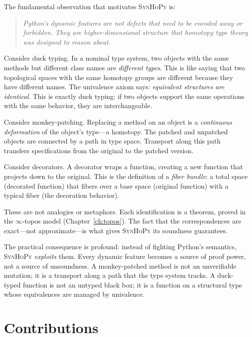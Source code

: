 \documentclass[11pt,a4paper]{report}
\theoremstyle{definition}
\theoremstyle{plain}
\newcommand{\synhopy}{\textsc{SynHoPy}}
\begin{document}
The fundamental observation that motivates \synhopy{} is:

\begin{quote}
\itshape
Python's dynamic features are not defects that need to be encoded away
or forbidden.  They are \emph{higher-dimensional structure} that homotopy
type theory was \emph{designed} to reason about.
\end{quote}

Consider duck typing.  In a nominal type system, two objects with the same
methods but different class names are \emph{different types}.  This is like
saying that two topological spaces with the same homotopy groups are
different because they have different names.  The univalence axiom says:
\emph{equivalent structures are identical}.  This is exactly duck typing:
if two objects support the same operations with the same behavior, they are
interchangeable.

Consider monkey-patching.  Replacing a method on an object is a
\emph{continuous deformation} of the object's type---a homotopy.  The
patched and unpatched objects are connected by a path in type space.
Transport along this path transfers specifications from the original to
the patched version.

Consider decorators.  A decorator wraps a function, creating a new function
that projects down to the original.  This is the definition of a
\emph{fiber bundle}: a total space (decorated function) that fibers over a
base space (original function) with a typical fiber (the decoration behavior).

These are not analogies or metaphors.  Each identification is a theorem,
proved in the $\infty$-topos model (Chapter~\ref{ch:topos}).  The fact
that the correspondences are exact---not approximate---is what gives
\synhopy{} its soundness guarantees.

The practical consequence is profound: instead of fighting Python's
semantics, \synhopy{} \emph{exploits} them.  Every dynamic feature becomes
a source of proof power, not a source of unsoundness.  A monkey-patched
method is not an unverifiable mutation; it is a transport along a path
that the type system tracks.  A duck-typed function is not an untyped
black box; it is a function on a structural type whose equivalences are
managed by univalence.

\section{Contributions}
\label{sec:contributions}
\end{document}
